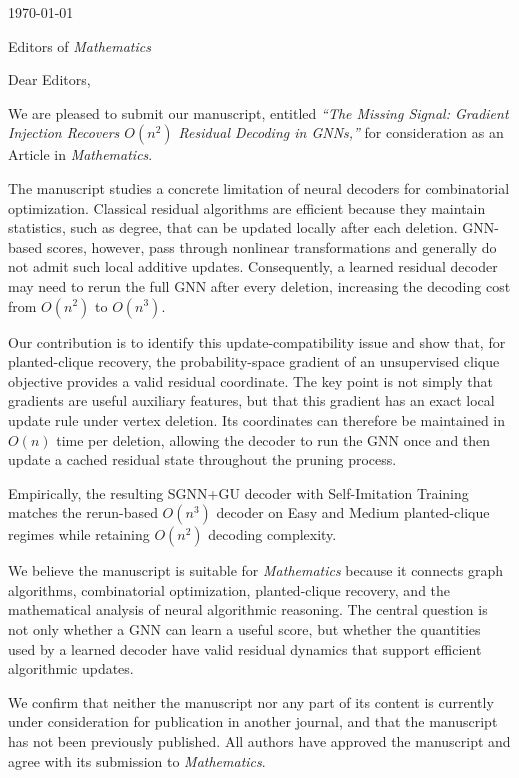 \documentclass[11pt]{article}
\begin{document}
\begin{flushright}
  \today
\end{flushright}

\vspace{1em}

\noindent
Editors of \textit{Mathematics}

\vspace{1em}

\noindent
Dear Editors,

We are pleased to submit our manuscript, entitled
\textit{``The Missing Signal: Gradient Injection Recovers $O(n^2)$ Residual
Decoding in GNNs,''} for consideration as an Article in \textit{Mathematics}.

The manuscript studies a concrete limitation of neural decoders for combinatorial
optimization. Classical residual algorithms are efficient because they maintain
statistics, such as degree, that can be updated locally after each deletion.
GNN-based scores, however, pass through nonlinear transformations and generally do
not admit such local additive updates. Consequently, a learned residual decoder may
need to rerun the full GNN after every deletion, increasing the decoding cost from
$O(n^2)$ to $O(n^3)$.

Our contribution is to identify this update-compatibility issue and show that, for
planted-clique recovery, the probability-space gradient of an unsupervised clique
objective provides a valid residual coordinate. The key point is not simply that
gradients are useful auxiliary features, but that this gradient has an exact local
update rule under vertex deletion. Its coordinates can therefore be maintained in
$O(n)$ time per deletion, allowing the decoder to run the GNN once and then update a
cached residual state throughout the pruning process.

Empirically, the resulting SGNN+GU decoder with Self-Imitation Training matches the
rerun-based $O(n^3)$ decoder on Easy and Medium planted-clique regimes while
retaining $O(n^2)$ decoding complexity.

We believe the manuscript is suitable for \textit{Mathematics} because it connects
graph algorithms, combinatorial optimization, planted-clique recovery, and the
mathematical analysis of neural algorithmic reasoning. The central question is not
only whether a GNN can learn a useful score, but whether the quantities used by a
learned decoder have valid residual dynamics that support efficient algorithmic
updates.

We confirm that neither the manuscript nor any part of its content is currently
under consideration for publication in another journal, and that the manuscript has
not been previously published. All authors have approved the manuscript and agree
with its submission to \textit{Mathematics}.
\end{document}
